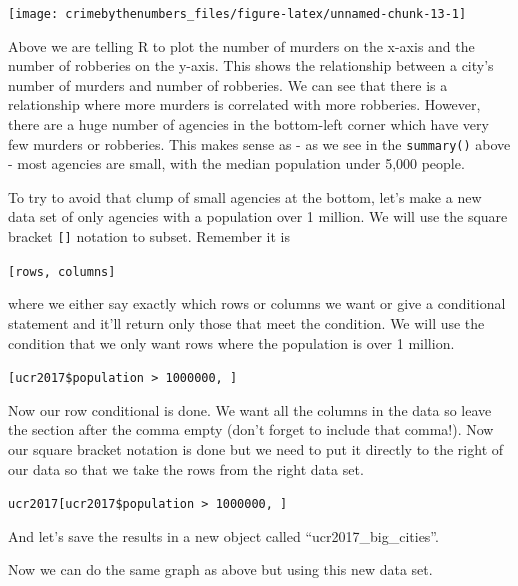\documentclass[
]{krantz}
\makeatletter
\newenvironment{Shaded}{\begin{snugshade}}{\end{snugshade}}
\newcommand{\FloatTok}[1]{\textcolor[rgb]{0.06,0.06,0.06}{#1}}
\newcommand{\NormalTok}[1]{#1}
\newcommand{\OtherTok}[1]{\textcolor[rgb]{0.37,0.37,0.37}{#1}}
\newcommand{\SpecialCharTok}[1]{\textcolor[rgb]{0,0,0}{#1}}
\newenvironment{kframe}{%
\medskip{}
\setlength{\fboxsep}{.8em}
 \def\at@end@of@kframe{}%
 \ifinner\ifhmode%
  \def\at@end@of@kframe{\end{minipage}}%
  \begin{minipage}{\columnwidth}%
 \fi\fi%
 \def\FrameCommand##1{\hskip\@totalleftmargin \hskip-\fboxsep
 \colorbox{shadecolor}{##1}\hskip-\fboxsep
     \hskip-\linewidth \hskip-\@totalleftmargin \hskip\columnwidth}%
 \MakeFramed {\advance\hsize-\width
   \@totalleftmargin\z@ \linewidth\hsize
   \@setminipage}}%
 {\par\unskip\endMakeFramed%
 \at@end@of@kframe}
\renewenvironment{Shaded}{\begin{kframe}}{\end{kframe}}
\makeatother
\begin{document}
\begin{center}\texttt{[image: crimebythenumbers\_files/figure-latex/unnamed-chunk-13-1]} \end{center}

Above we are telling R to plot the number of murders on the x-axis and the number of robberies on the y-axis. This shows the relationship between a city's number of murders and number of robberies. We can see that there is a relationship where more murders is correlated with more robberies. However, there are a huge number of agencies in the bottom-left corner which have very few murders or robberies. This makes sense as - as we see in the \texttt{summary()} above - most agencies are small, with the median population under 5,000 people.

To try to avoid that clump of small agencies at the bottom, let's make a new data set of only agencies with a population over 1 million. We will use the square bracket \texttt{{[}{]}} notation to subset. Remember it is

\texttt{{[}rows,\ columns{]}}

where we either say exactly which rows or columns we want or give a conditional statement and it'll return only those that meet the condition. We will use the condition that we only want rows where the population is over 1 million.

\texttt{{[}ucr2017\$population\ \textgreater{}\ 1000000,\ {]}}

Now our row conditional is done. We want all the columns in the data so leave the section after the comma empty (don't forget to include that comma!). Now our square bracket notation is done but we need to put it directly to the right of our data so that we take the rows from the right data set.

\texttt{ucr2017{[}ucr2017\$population\ \textgreater{}\ 1000000,\ {]}}

And let's save the results in a new object called ``ucr2017\_big\_cities''.

\begin{Shaded}
\end{Shaded}

Now we can do the same graph as above but using this new data set.
\end{document}
